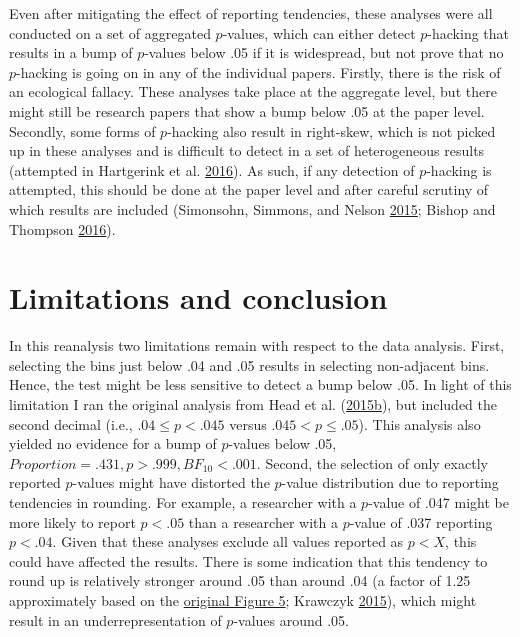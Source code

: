 \documentclass[a5paper]{book}
\begin{document}
Even after mitigating the effect of reporting tendencies, these analyses
were all conducted on a set of aggregated \(p\)-values, which can either
detect \(p\)-hacking that results in a bump of \(p\)-values below .05 if
it is widespread, but not prove that no \(p\)-hacking is going on in any
of the individual papers. Firstly, there is the risk of an ecological
fallacy. These analyses take place at the aggregate level, but there
might still be research papers that show a bump below .05 at the paper
level. Secondly, some forms of \(p\)-hacking also result in right-skew,
which is not picked up in these analyses and is difficult to detect in a
set of heterogeneous results (attempted in Hartgerink et al.
\protect\hyperlink{ref-doi:10.7717ux2fpeerj.1935}{2016}). As such, if
any detection of \(p\)-hacking is attempted, this should be done at the
paper level and after careful scrutiny of which results are included
(Simonsohn, Simmons, and Nelson
\protect\hyperlink{ref-doi:10.1037ux2fxge0000104}{2015}; Bishop and
Thompson \protect\hyperlink{ref-doi:10.7717ux2fpeerj.1715}{2016}).

\section{Limitations and conclusion}\label{limitations-and-conclusion}

In this reanalysis two limitations remain with respect to the data
analysis. First, selecting the bins just below .04 and .05 results in
selecting non-adjacent bins. Hence, the test might be less sensitive to
detect a bump below .05. In light of this limitation I ran the original
analysis from Head et al.
(\protect\hyperlink{ref-doi:10.1371ux2fjournal.pbio.1002106}{2015}\protect\hyperlink{ref-doi:10.1371ux2fjournal.pbio.1002106}{b}),
but included the second decimal (i.e., \(.04\leq p<.045\) versus
\(.045<p\leq.05\)). This analysis also yielded no evidence for a bump of
\(p\)-values below .05, \(Proportion=.431,p>.999,BF_{10}<.001\). Second,
the selection of only exactly reported \(p\)-values might have distorted
the \(p\)-value distribution due to reporting tendencies in rounding.
For example, a researcher with a \(p\)-value of .047 might be more
likely to report \(p<.05\) than a researcher with a \(p\)-value of .037
reporting \(p<.04\). Given that these analyses exclude all values
reported as \(p<X\), this could have affected the results. There is some
indication that this tendency to round up is relatively stronger around
.05 than around .04 (a factor of 1.25 approximately based on the
\href{https://doi.org/10.1371/journal.pone.0127872.g005}{original Figure
5}; Krawczyk
\protect\hyperlink{ref-doi:10.1371ux2fjournal.pone.0127872}{2015}),
which might result in an underrepresentation of \(p\)-values around .05.
\end{document}
